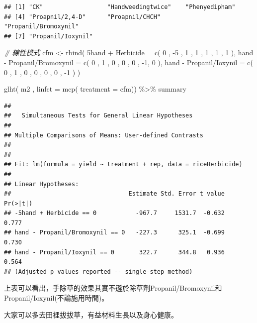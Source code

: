 \documentclass[
]{book}
\newenvironment{Shaded}{\begin{snugshade}}{\end{snugshade}}
\newcommand{\AttributeTok}[1]{\textcolor[rgb]{0.77,0.63,0.00}{#1}}
\newcommand{\CommentTok}[1]{\textcolor[rgb]{0.56,0.35,0.01}{\textit{#1}}}
\newcommand{\DecValTok}[1]{\textcolor[rgb]{0.00,0.00,0.81}{#1}}
\newcommand{\FunctionTok}[1]{\textcolor[rgb]{0.00,0.00,0.00}{#1}}
\newcommand{\NormalTok}[1]{#1}
\newcommand{\OtherTok}[1]{\textcolor[rgb]{0.56,0.35,0.01}{#1}}
\newcommand{\SpecialCharTok}[1]{\textcolor[rgb]{0.00,0.00,0.00}{#1}}
\newcommand{\StringTok}[1]{\textcolor[rgb]{0.31,0.60,0.02}{#1}}
\begin{document}
\begin{verbatim}
## [1] "CK"                  "Handweedingtwice"    "Phenyedipham"       
## [4] "Proapnil/2,4-D"      "Proapnil/CHCH"       "Propanil/Bromoxynil"
## [7] "Propanil/Ioxynil"
\end{verbatim}

\begin{Shaded}
\begin{Highlighting}[]
\CommentTok{\# 線性模式}
\NormalTok{cfm }\OtherTok{\textless{}{-}} \FunctionTok{rbind}\NormalTok{(}
  \StringTok{\textquotesingle{}{-}5hand + Herbicide\textquotesingle{}}     \OtherTok{=} \FunctionTok{c}\NormalTok{( }\DecValTok{0}\NormalTok{ , }\SpecialCharTok{{-}}\DecValTok{5}\NormalTok{ , }\DecValTok{1}\NormalTok{ , }\DecValTok{1}\NormalTok{ , }\DecValTok{1}\NormalTok{ , }\DecValTok{1}\NormalTok{ , }\DecValTok{1}\NormalTok{ ),}
  \StringTok{\textquotesingle{}hand {-} Propanil/Bromoxynil\textquotesingle{}} \OtherTok{=} \FunctionTok{c}\NormalTok{( }\DecValTok{0}\NormalTok{ , }\DecValTok{1}\NormalTok{  , }\DecValTok{0}\NormalTok{ , }\DecValTok{0}\NormalTok{ , }\DecValTok{0}\NormalTok{ , }\SpecialCharTok{{-}}\DecValTok{1}\NormalTok{, }\DecValTok{0}\NormalTok{ ),}
  \StringTok{\textquotesingle{}hand {-} Propanil/Ioxynil\textquotesingle{}}    \OtherTok{=} \FunctionTok{c}\NormalTok{( }\DecValTok{0}\NormalTok{ , }\DecValTok{1}\NormalTok{  , }\DecValTok{0}\NormalTok{ , }\DecValTok{0}\NormalTok{ , }\DecValTok{0}\NormalTok{ , }\DecValTok{0}\NormalTok{ , }\SpecialCharTok{{-}}\DecValTok{1}\NormalTok{ ) )}

\FunctionTok{glht}\NormalTok{( m2 , }\AttributeTok{linfct =} \FunctionTok{mcp}\NormalTok{( }\AttributeTok{treatment =}\NormalTok{ cfm)) }\SpecialCharTok{\%\textgreater{}\%}
\NormalTok{  summary}
\end{Highlighting}
\end{Shaded}

\begin{verbatim}
## 
##   Simultaneous Tests for General Linear Hypotheses
## 
## Multiple Comparisons of Means: User-defined Contrasts
## 
## 
## Fit: lm(formula = yield ~ treatment + rep, data = riceHerbicide)
## 
## Linear Hypotheses:
##                                 Estimate Std. Error t value Pr(>|t|)
## -5hand + Herbicide == 0           -967.7     1531.7  -0.632    0.777
## hand - Propanil/Bromoxynil == 0   -227.3      325.1  -0.699    0.730
## hand - Propanil/Ioxynil == 0       322.7      344.8   0.936    0.564
## (Adjusted p values reported -- single-step method)
\end{verbatim}

上表可以看出，手除草的效果其實不遜於除草劑Propanil/Bromoxynil和Propanil/Ioxynil(不論施用時間)。

大家可以多去田裡拔拔草，有益材料生長以及身心健康。

  
\end{document}
